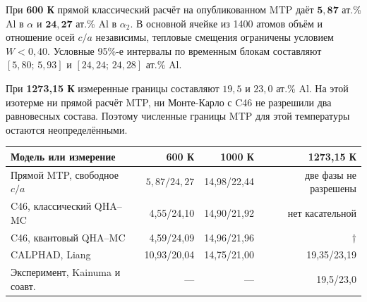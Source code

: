 \documentclass[11pt,a4paper]{article}
\begin{document}
\newcommand{\LowAlpha}{5{,}87}
\newcommand{\LowAlphaLo}{5{,}80}
\newcommand{\LowAlphaHi}{5{,}93}
\newcommand{\LowOrdered}{24{,}27}
\newcommand{\LowOrderedLo}{24{,}24}
\newcommand{\LowOrderedHi}{24{,}28}
\newcommand{\FixedAlpha}{7{,}57}
\newcommand{\FixedOrdered}{23{,}82}
\newcommand{\ChiMiddle}{0{,}529}
\newcommand{\ChiLarge}{0{,}542}

\thispagestyle{plain}
\vspace{3mm}
\vspace{1.5mm}
\vspace{2mm}\noindent{\color{teal}\rule{\linewidth}{1pt}}\par

\noindent При \textbf{600 К} прямой классический расчёт на опубликованном MTP
даёт \(\boldsymbol{\LowAlpha}\) ат.\% Al в \(\alpha\) и
\(\boldsymbol{\LowOrdered}\) ат.\% Al в \(\alpha_2\). В основной
ячейке из 1400 атомов объём и отношение осей \(c/a\) независимы,
тепловые смещения ограничены условием \(W<0{,}40\). Условные 95\%-е
интервалы по временным блокам составляют
\([\LowAlphaLo;\,\LowAlphaHi]\) и \([\LowOrderedLo;\,\LowOrderedHi]\) ат.\% Al.

При \textbf{1273,15 К} измеренные границы составляют \(19{,}5\) и
\(23{,}0\) ат.\% Al. На этой изотерме ни прямой расчёт MTP, ни
Монте-Карло с C46 не разрешили два равновесных состава. Поэтому
численные границы MTP для этой температуры остаются неопределёнными.

\begin{center}\small
\begin{tabular}{@{}lrrr@{}}
\toprule
Модель или измерение & 600 К & 1000 К & 1273,15 К\\
\midrule
Прямой MTP, свободное \(c/a\) & \(\LowAlpha/\LowOrdered\) & 14,98/22,44 & две фазы не разрешены\\
C46, классический QHA--MC    & 4,55/24,10 & 14,90/21,92 & нет касательной\\
C46, квантовый QHA--MC       & 4,59/24,09 & 14,96/21,96 & \(\dagger\)\\
CALPHAD, Liang                & 10,93/20,04 & 14,75/21,00 & 19,35/23,19\\
Эксперимент, Kainuma и соавт. & --- & --- & 19,5/23,0\\
\bottomrule
\end{tabular}
\end{center}
\end{document}

